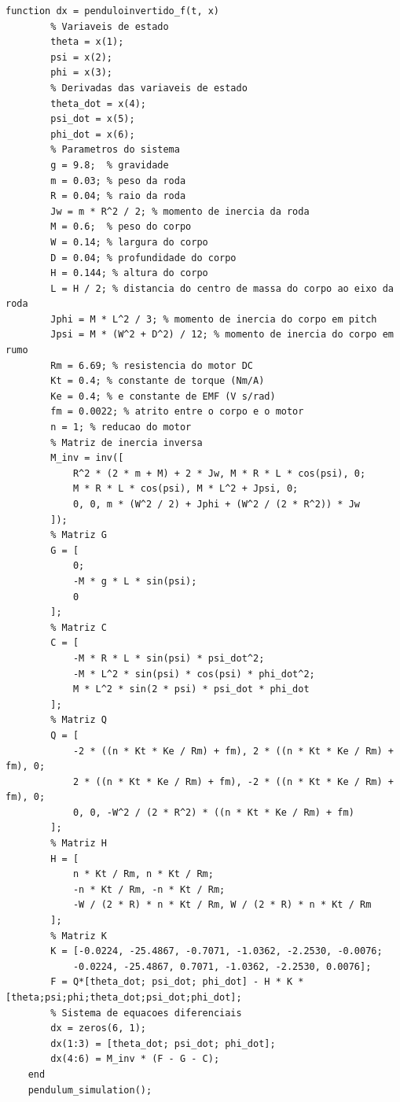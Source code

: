 \documentclass[10pt]{article}
\begin{document}
\begin{appendices}
\begin{lstlisting}[caption={Código da simulação do sistema com ode45}, label=lst:pendulum_sim_r]
    function dx = penduloinvertido_f(t, x)
        % Variaveis de estado
        theta = x(1);
        psi = x(2);
        phi = x(3);
        % Derivadas das variaveis de estado
        theta_dot = x(4);
        psi_dot = x(5);
        phi_dot = x(6);
        % Parametros do sistema
        g = 9.8;  % gravidade
        m = 0.03; % peso da roda
        R = 0.04; % raio da roda
        Jw = m * R^2 / 2; % momento de inercia da roda
        M = 0.6;  % peso do corpo
        W = 0.14; % largura do corpo
        D = 0.04; % profundidade do corpo
        H = 0.144; % altura do corpo
        L = H / 2; % distancia do centro de massa do corpo ao eixo da roda
        Jphi = M * L^2 / 3; % momento de inercia do corpo em pitch
        Jpsi = M * (W^2 + D^2) / 12; % momento de inercia do corpo em rumo
        Rm = 6.69; % resistencia do motor DC
        Kt = 0.4; % constante de torque (Nm/A)
        Ke = 0.4; % e constante de EMF (V s/rad)
        fm = 0.0022; % atrito entre o corpo e o motor
        n = 1; % reducao do motor
        % Matriz de inercia inversa
        M_inv = inv([
            R^2 * (2 * m + M) + 2 * Jw, M * R * L * cos(psi), 0;
            M * R * L * cos(psi), M * L^2 + Jpsi, 0;
            0, 0, m * (W^2 / 2) + Jphi + (W^2 / (2 * R^2)) * Jw
        ]);
        % Matriz G
        G = [
            0;
            -M * g * L * sin(psi);
            0
        ];
        % Matriz C
        C = [
            -M * R * L * sin(psi) * psi_dot^2;
            -M * L^2 * sin(psi) * cos(psi) * phi_dot^2;
            M * L^2 * sin(2 * psi) * psi_dot * phi_dot
        ];
        % Matriz Q
        Q = [
            -2 * ((n * Kt * Ke / Rm) + fm), 2 * ((n * Kt * Ke / Rm) + fm), 0;
            2 * ((n * Kt * Ke / Rm) + fm), -2 * ((n * Kt * Ke / Rm) + fm), 0;
            0, 0, -W^2 / (2 * R^2) * ((n * Kt * Ke / Rm) + fm)
        ];
        % Matriz H
        H = [
            n * Kt / Rm, n * Kt / Rm;
            -n * Kt / Rm, -n * Kt / Rm;
            -W / (2 * R) * n * Kt / Rm, W / (2 * R) * n * Kt / Rm
        ];
        % Matriz K
        K = [-0.0224, -25.4867, -0.7071, -1.0362, -2.2530, -0.0076;
            -0.0224, -25.4867, 0.7071, -1.0362, -2.2530, 0.0076];
        F = Q*[theta_dot; psi_dot; phi_dot] - H * K * [theta;psi;phi;theta_dot;psi_dot;phi_dot];
        % Sistema de equacoes diferenciais
        dx = zeros(6, 1);
        dx(1:3) = [theta_dot; psi_dot; phi_dot];
        dx(4:6) = M_inv * (F - G - C);
    end
    pendulum_simulation();
\end{lstlisting}

\end{appendices}
\end{document}
